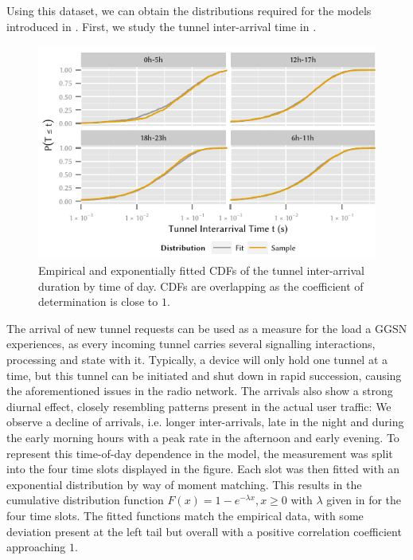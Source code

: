 Using this dataset, we can obtain the distributions required for the models introduced in .
First, we study the tunnel inter-arrival time in .

\begin{figure}
  \centering
  \includegraphics{cloud/virtualized_network_functions/measurement_data/figures/tunnel_iat}
  \caption{Empirical and exponentially fitted CDFs of the tunnel inter-arrival duration by time of day. CDFs are overlapping as the coefficient of determination is close to \(1\).}
  \label{fig:cloud:virtualized_network_functions:measurement_data:evaluation:tunnel_iat}
\end{figure}

The arrival of new tunnel requests can be used as a measure for the load a \gls{GGSN} experiences, as every incoming tunnel carries several signalling interactions, processing and state with it.
Typically, a device will only hold one tunnel at a time, but this tunnel can be initiated and shut down in rapid succession, causing the aforementioned issues in the radio network.
The arrivals also show a strong diurnal effect, closely resembling patterns present in the actual user traffic:
We observe a decline of arrivals, i.e. longer inter-arrivals, late in the night and during the early morning hours with a peak rate in the afternoon and early evening.
To represent this time-of-day dependence in the model, the measurement was split into the four time slots displayed in the figure.
Each slot was then fitted with an exponential distribution by way of moment matching.
This results in the cumulative distribution function \(F(x) = 1- e^{-\lambda x}, x \geq 0\) with \(\lambda\) given in  for the four time slots.
The fitted functions match the empirical data, with some deviation present at the left tail but overall with a positive correlation coefficient approaching \(1\).

